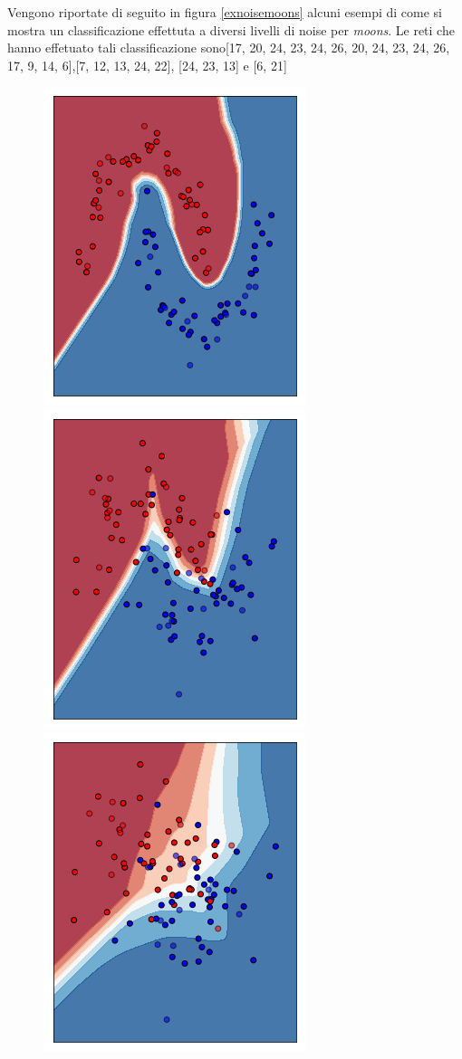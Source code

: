 \documentclass[12pt,a4paper]{report}
\begin{document}
Vengono riportate di seguito in figura \ref{exnoisemoons} alcuni esempi di come si mostra un classificazione effettuta a diversi livelli di noise per \textit{moons}.
Le reti che hanno effetuato tali classificazione sono[17, 20, 24, 23, 24, 26, 20, 24, 23, 24, 26, 17, 9, 14, 6],[7, 12, 13, 24, 22], [24, 23, 13] e [6, 21]

\begin{figure}[H]
\centering
 \includegraphics[scale = 0.4]{images/moons-noise0,1}
 \includegraphics[scale = 0.4]{images/moons-noise0,3}
 \includegraphics[scale = 0.4]{images/moons-noise0,6}

\end{figure}
\end{document}
